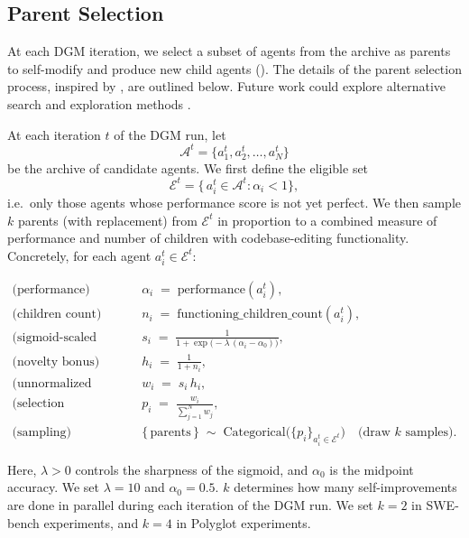 \documentclass{article} %
\begin{document}


\subsection{Parent Selection}
\label{app:parent-select}

At each DGM iteration, we select a subset of agents from the archive as parents to self-modify and produce new child agents (). The details of the parent selection process, inspired by \citet{ecoffet2019go}, are outlined below. Future work could explore alternative search and exploration methods \citep{coulom2006efficient, silver2016mastering, herr2025llm}.

At each iteration \(t\) of the DGM run, let
\[
\mathcal{A}^t = \{a_1^t, a_2^t, \dots, a_N^t\}
\]
be the archive of candidate agents.  We first define the eligible set
\[
\mathcal{E}^t = \bigl\{\,a_i^t \in \mathcal{A}^t : \alpha_i < 1 \bigr\},
\]
i.e.\ only those agents whose performance score is not yet perfect. We then sample \(k\) parents (with replacement) from \(\mathcal{E}^t\) in proportion to a combined measure of performance and number of children with codebase-editing functionality. Concretely, for each agent \(a_i^t \in \mathcal{E}^t\):

\begin{align}
\text{(performance)}\quad & \alpha_i \;=\; \mathrm{performance}(a_i^t), 
\\
\text{(children count)}\quad & n_i \;=\; \mathrm{functioning\_children\_count}(a_i^t),
\\[6pt]
\text{(sigmoid‐scaled performance)}\quad 
& s_i \;=\; \frac{1}{1 + \exp\!\bigl(-\lambda\,(\alpha_i - \alpha_0)\bigr)},
\\[4pt]
\text{(novelty bonus)}\quad 
& h_i \;=\; \frac{1}{1 + n_i},
\\[4pt]
\text{(unnormalized weight)}\quad 
& w_i \;=\; s_i\,h_i,
\\[4pt]
\text{(selection probability)}\quad 
& p_i \;=\; \frac{w_i}{\sum_{j=1}^{N} w_j},
\\[8pt]
\text{(sampling)}\quad 
& \{\,\text{parents}\,\} \;\sim\; \mathrm{Categorical}\bigl(\{p_i\}_{a_i^t \in \mathcal{E}^t}\bigr)\quad\text{(draw \(k\) samples).}
\end{align}

Here, \(\lambda>0\) controls the sharpness of the sigmoid, and \(\alpha_0\) is the midpoint accuracy. We set \(\lambda=10\) and \(\alpha_0=0.5\). \(k\) determines how many self-improvements are done in parallel during each iteration of the DGM run. We set \(k=2\) in SWE-bench experiments, and \(k=4\) in Polyglot experiments.
\end{document}
